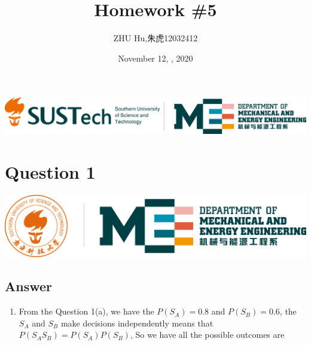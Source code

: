 \documentclass[
	12pt, %
]{fphw}
\begin{document}
\title{Homework \#5} %
\author{ZHU Hu,朱虎12032412} %
\date{November 12, , 2020} %
\includegraphics[scale=0.75]{img/logo2.png}


\setlength{\abovecaptionskip}{-0.1cm}
\setlength{\belowcaptionskip}{0cm}   %


\maketitle %


\section*{Question 1}
\begin{problem}
	\includegraphics[width=440pt]{img/logo.png}
\end{problem}


\subsection*{Answer}
\begin{enumerate}
    \item From the Question 1(a), we have the $P(S_A)=0.8$ and $P(S_B)=0.6$, the $S_A$ and $S_B$ make decisions independently means that $P(S_AS_B)=P(S_A)P(S_B)$, So we have all the possible outcomes are 
\end{enumerate}
\clearpage
\end{document}
